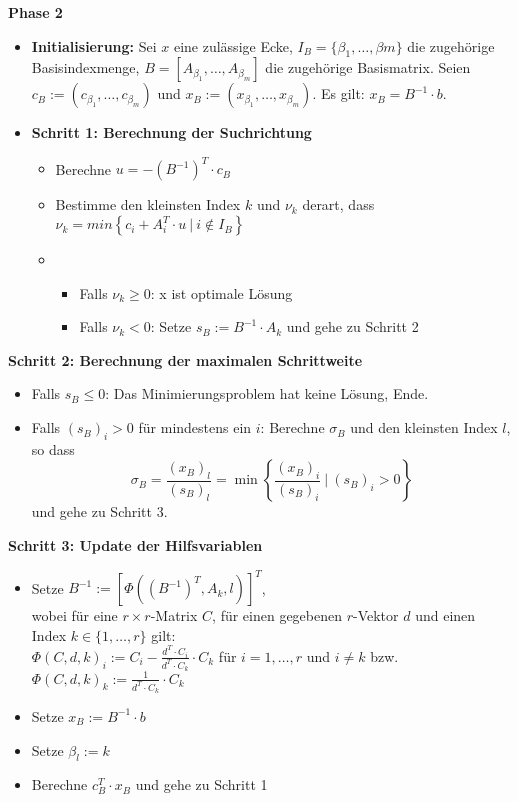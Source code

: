 \documentclass[slidesonly]{seminar}
\newcommand{\subheader}[1]{\par\textbf{#1}{}}
\begin{document}
%
\begin{slide}
\subheader{Phase 2}
\begin{itemize}
\item
\textbf{Initialisierung:} Sei $x$ eine zul\"assige Ecke, $I_{B}=\{\beta_{1},\dots,\beta{m}\}$ die zugeh\"orige Basisindexmenge, $B=[A_{\beta_{1}},\dots,A_{\beta_{m}}]$ die zugeh\"orige Basismatrix. Seien $c_{B}:=(c_{\beta_{1}},\dots,c_{\beta_{m}})$ und $x_{B}:=(x_{\beta_{1}},\dots,x_{\beta_{m}})$. Es gilt: $x_{B}=B^{-1}\cdot b$.
\item
\textbf{Schritt 1: Berechnung der Suchrichtung}
\begin{itemize}
\item 
Berechne $u=-(B^{-1})^{T}\cdot c_{B}$
\item 
Bestimme den kleinsten Index $k$ und $\nu_{k}$ derart, dass $\nu_{k}=min\left\{c_{i}+A_{i}^{T}\cdot u \ | \ i \notin I_{B}\right\}$
\item
\begin{itemize}
\item 
Falls $\nu_{k} \geq 0$: x ist optimale L\"osung
\item
Falls $\nu_{k} < 0$: Setze $s_{B}:=B^{-1}\cdot A_{k}$ und gehe zu Schritt 2
\end{itemize}
\end{itemize}
\end{itemize}
\end{slide}
\begin{slide}
\subheader{Schritt 2: Berechnung der maximalen Schrittweite}
\begin{itemize}
\item Falls $s_{B} \leq 0$: Das Minimierungsproblem hat keine L\"osung, Ende.
\item Falls $(s_{B})_{i} > 0$ f\"ur mindestens ein $i$: Berechne $\sigma_{B}$ und den kleinsten Index $l$, so dass 
\begin{displaymath}
\sigma_{B}=\frac{(x_{B})_{l}}{(s_{B})_{l}}=\min\left\{\frac{(x_{B})_{i}}{(s_{B})_{i}} \ \Big| \ (s_{B})_{i} >0 \right\}
\end{displaymath}
und gehe zu Schritt 3.
\end{itemize}

\end{slide}
\begin{slide}
\subheader{Schritt 3: Update der Hilfsvariablen}
\begin{itemize}
\item
Setze $B^{-1}:=[\Phi((B^{-1})^{T},A_{k},l)]^{T}$, \\
wobei f\"ur eine $r\times r$-Matrix $C$, f\"ur einen gegebenen $r$-Vektor $d$ und einen Index $k\in \{1,\dots,r\}$ gilt: \\
$\Phi(C,d,k)_{i}:=C_{i}-\frac{d^{T}\cdot C_{i}}{d^{T}\cdot C_{k}}\cdot C_{k}$ f\"ur $i=1,\dots,r$ und $i\neq k$ bzw. \\
$\Phi(C,d,k)_{k}:=\frac{1}{d^{T}\cdot C_{k}}\cdot C_{k}$
\item
Setze $x_{B}:=B^{-1}\cdot b$
\item
Setze $\beta_{l}:=k$
\item 
Berechne $c_{B}^{T}\cdot x_{B}$ und gehe zu Schritt 1
\end{itemize} 
\end{slide}
\end{document}
